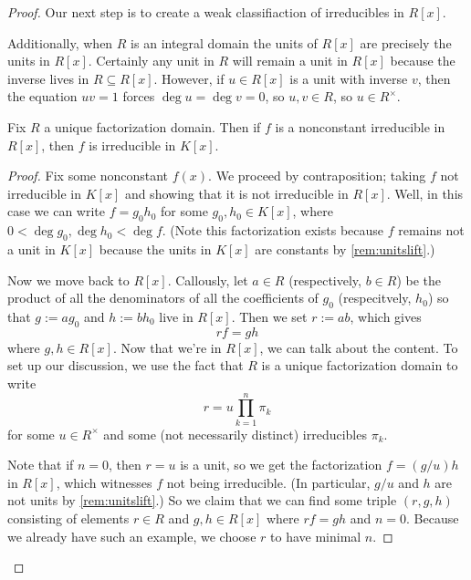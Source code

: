 \begin{proof}
	Our next step is to create a weak classifiaction of irreducibles in $R[x]$.
	\begin{remark}[Nir] \label{rem:unitslift}
		Additionally, when $R$ is an integral domain the units of $R[x]$ are precisely the units in $R[x]$. Certainly any unit in $R$ will remain a unit in $R[x]$ because the inverse lives in $R\subseteq R[x]$. However, if $u\in R[x]$ is a unit with inverse $v$, then the equation $uv=1$ forces $\deg u=\deg v=0$, so $u,v\in R$, so $u\in R^\times$.
	\end{remark}
	\begin{lemma} \label{lem:irredfracfield}
		Fix $R$ a unique factorization domain. Then if $f$ is a nonconstant irreducible in $R[x]$, then $f$ is irreducible in $K[x]$.
	\end{lemma}
	\begin{proof}
		Fix some nonconstant $f(x)$. We proceed by contraposition; taking $f$ not irreducible in $K[x]$ and showing that it is not irreducible in $R[x]$. Well, in this case we can write $f=g_0h_0$ for some $g_0,h_0\in K[x]$, where $0<\deg g_0,\deg h_0<\deg f$. (Note this factorization exists because $f$ remains not a unit in $K[x]$ because the units in $K[x]$ are constants by \autoref{rem:unitslift}.)
		
		Now we move back to $R[x]$. Callously, let $a\in R$ (respectively, $b\in R$) be the product of all the denominators of all the coefficients of $g_0$ (respecitvely, $h_0$) so that $g:=ag_0$ and $h:=bh_0$ live in $R[x]$. Then we set $r:=ab$, which gives
		\[rf=gh\]
		where $g,h\in R[x]$. Now that we're in $R[x]$, we can talk about the content. To set up our discussion, we use the fact that $R$ is a unique factorization domain to write
		\[r=u\prod_{k=1}^n\pi_k\]
		for some $u\in R^\times$ and some (not necessarily distinct) irreducibles $\pi_k$.

		Note that if $n=0$, then $r=u$ is a unit, so we get the factorization $f=(g/u)h$ in $R[x]$, which witnesses $f$ not being irreducible. (In particular, $g/u$ and $h$ are not units by \autoref{rem:unitslift}.) So we claim that we can find some triple $(r,g,h)$ consisting of elements $r\in R$ and $g,h\in R[x]$ where $rf=gh$ and $n=0$. Because we already have such an example, we choose $r$ to have minimal $n$.


\end{proof}
\end{proof}
